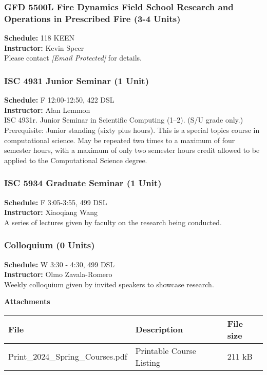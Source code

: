 \documentclass[12pt,a4paper]{article}
\begin{document}
\subsubsection*{GFD 5500L Fire Dynamics Field School Research and Operations in Prescribed Fire (3-4 Units)}
\textbf{Schedule:} 118 KEEN \\
\textbf{Instructor:} Kevin Speer \\
Please contact \textit{[Email Protected]} for details.

\subsubsection*{ISC 4931 Junior Seminar (1 Unit)}
\textbf{Schedule:} F 12:00-12:50, 422 DSL \\
\textbf{Instructor:} Alan Lemmon \\
ISC 4931r. Junior Seminar in Scientific Computing (1–2). (S/U grade only.) Prerequisite: Junior standing (sixty plus hours). This is a special topics course in computational science. May be repeated two times to a maximum of four semester hours, with a maximum of only two semester hours credit allowed to be applied to the Computational Science degree.

\subsubsection*{ISC 5934 Graduate Seminar (1 Unit)}
\textbf{Schedule:} F 3:05-3:55, 499 DSL \\
\textbf{Instructor:} Xiaoqiang Wang \\
A series of lectures given by faculty on the research being conducted.

\subsubsection*{Colloquium (0 Units)}
\textbf{Schedule:} W 3:30 - 4:30, 499 DSL \\
\textbf{Instructor:} Olmo Zavala-Romero \\
Weekly colloquium given by invited speakers to showcase research.

\begin{center}
\textbf{Attachments}
\begin{tabular}{l l l}
\hline
\textbf{File} & \textbf{Description} & \textbf{File size} \\ \hline
Print\_2024\_Spring\_Courses.pdf & Printable Course Listing & 211 kB \\ \hline
\end{tabular}
\end{center}
\newpage
\end{document}
